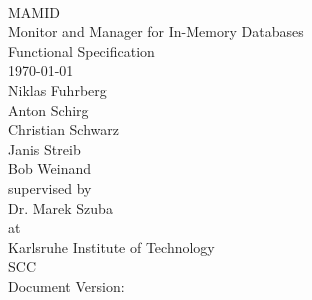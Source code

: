 \documentclass[a4paper, 11pt]{article}
\begin{document}
\newcommand{\refsymbol}[0]{\scalebox{0.5}{$\nearrow$}}
\let\oldref\ref
\renewcommand{\ref}[1]{\refsymbol\oldref{#1}}
\let\oldgls\gls
\renewcommand{\gls}[1]{\refsymbol\oldgls{#1}}
\let\oldGls\Gls
\renewcommand{\Gls}[1]{\refsymbol\oldGls{#1}}
\let\oldglspl\glspl
\renewcommand{\glspl}[1]{\refsymbol\oldglspl{#1}}
\let\oldGlspl\Glspl
\renewcommand{\Glspl}[1]{\refsymbol\oldGlspl{#1}}
\let\oldglslink\glslink
\renewcommand{\glslink}[2]{\refsymbol\oldglslink{#1}{#2}}
\let\oldhyperref\hyperref
\renewcommand{\hyperref}[2][notActuallyOptional]{\refsymbol\oldhyperref[#1]{#2}}
\let\oldautoref\autoref
\renewcommand{\autoref}[1]{\refsymbol\oldautoref{#1}}

\newcommand{\abbildung}[1]{\autoref{fig:#1}}
\newcommand{\mamid}{\textit{MAMID}\xspace}



\begin{titlepage}
\makeatletter
\begin{center}
~\\[4em]
{\Huge MAMID}\\[.8em]\huge{Monitor and Manager for In-Memory Databases}\\[2em]
{\huge Functional Specification}\\[1em]
{\large\today}\\[2.5em]
{\LARGE
Niklas Fuhrberg\\
Anton Schirg\\
Christian Schwarz\\
Janis Streib\\
Bob Weinand\\[3em]}
{\Large supervised by}\\[2em]
{\LARGE
Dr. Marek Szuba\\[1em]}
{\Large at}\\[1em]
{\LARGE
Karlsruhe Institute of Technology\\
SCC\\[2em]}
{\color{gray}
  \small Document Version: 
}
\end{center}
\makeatother
\end{titlepage}
\newpage
\tableofcontents
\newpage

\end{document}
